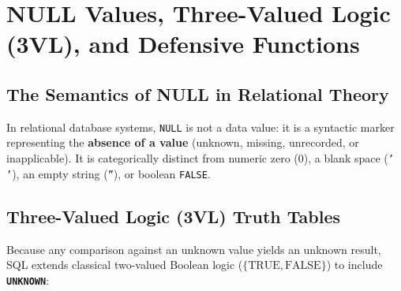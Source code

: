 \section{NULL Values, Three-Valued Logic (3VL), and Defensive Functions}
\label{sec:dbms_null_3vl}

\subsection{The Semantics of NULL in Relational Theory}
In relational database systems, \texttt{NULL} is not a data value: it is a syntactic marker representing the \textbf{absence of a value} (unknown, missing, unrecorded, or inapplicable). It is categorically distinct from numeric zero ($0$), a blank space (\texttt{' '}), an empty string (\texttt{''}), or boolean \texttt{FALSE}.

\subsection{Three-Valued Logic (3VL) Truth Tables}
Because any comparison against an unknown value yields an unknown result, SQL extends classical two-valued Boolean logic ($\{\text{TRUE}, \text{FALSE}\}$) to include \textbf{\texttt{UNKNOWN}}:

